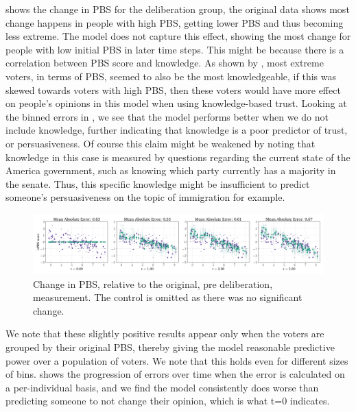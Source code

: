  shows the change in  PBS for the deliberation group,
the original data shows most change happens in people with high  PBS,
getting lower PBS and thus becoming less extreme. The model does not capture
this effect, showing the most change for people with low initial  PBS in
later time steps. This might be because there is a correlation between PBS
score and knowledge. As shown by \citet{fishkinCanDeliberationHave2024}, most
extreme voters, in terms of PBS, seemed to also be the most knowledgeable, if
this was skewed towards voters with high PBS, then these voters would have more
effect on people's opinions in this model when using knowledge-based trust.
Looking at the binned errors in , we see that the model
performs better when we do not include knowledge, further indicating that
knowledge is a poor predictor of trust, or persuasiveness. Of course this claim
might be weakened by noting that knowledge in this case is measured by
questions regarding the current state of the America government, such as knowing
which party currently has a majority in the senate. Thus, this specific
knowledge might be insufficient to predict someone's persuasiveness on the
topic of immigration for example.


\begin{figure}[h]
	\begin{center}
		\includegraphics[width=\textwidth]{Figures/change_pbs_scores.png}
	\end{center}
	\caption{Change in  PBS, relative to the original, pre deliberation, measurement. The control is  omitted as there was no significant change.}\label{fig:delta_pbs}
\end{figure}


We note that these slightly positive results appear only when the voters are
grouped by their original PBS, thereby giving the model reasonable predictive
power over a population of voters. We note that this holds even for different
sizes of bins.  shows the progression of errors over
time when the error is calculated on a per-individual basis, and we find the
model consistently does worse than predicting someone to not change their
opinion, which is what t=0 indicates.

